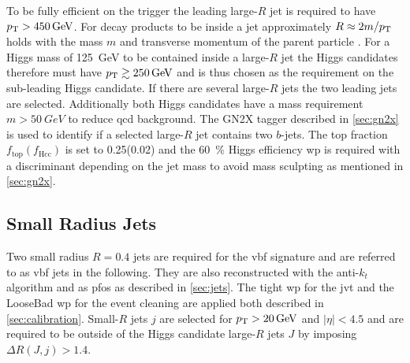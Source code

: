 To be fully efficient on the trigger the leading large-$R$ jet is required to have $p_{\text{T}}>\qty[]{450}{GeV}$. For decay products to be inside a jet approximately $R\approx 2m/p_{\text{T}}$ holds with the mass $m$ and transverse momentum of the parent particle \citep{ATLAS-CONF-2020-022}. For a Higgs mass of \qty[]{125}{GeV} to be contained inside a large-$R$ jet the Higgs candidates therefore must have $p_{\text{T}}\gtrsim \qty[]{250}{GeV}$ and is thus chosen as the \pt requirement on the sub-leading Higgs candidate. If there are several large-$R$ jets the two leading \pt jets are selected. Additionally both Higgs candidates have a mass requirement $m>\qty[]{50}{GeV}$ to reduce \ac{qcd} background. The GN2X tagger described in \ref{sec:gn2x} is used to identify if a selected large-$R$ jet contains two $b$-jets. The top fraction $f_\text{top}(f_\text{Hcc})$ is set to 0.25(0.02) and the \qty[]{60}{\percent} Higgs efficiency \ac{wp} is required with a discriminant depending on the jet mass to avoid mass sculpting as mentioned in \ref{sec:gn2x}.


\subsection{Small Radius Jets}
Two small radius $R=0.4$ jets are required for the \ac{vbf} signature and are referred to as \ac{vbf} jets in the following. They are also reconstructed with the anti-$k_t$ algorithm and as \acp{pfo} as described in \ref{sec:jets}. The tight \ac{wp} for the \ac{jvt} and the LooseBad \ac{wp} for the event cleaning are applied both described in \ref{sec:calibration}. Small-$R$ jets $j$ are selected for $p_{\text{T}}>\qty[]{20}{GeV}$ and $|\eta|<4.5$ and are required to be outside of the Higgs candidate large-$R$ jets $J$ by imposing $\Delta R(J,j) > 1.4$. 

